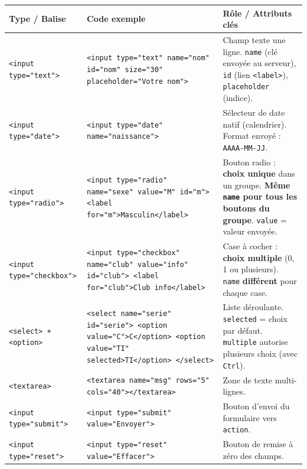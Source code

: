 \documentclass[11pt]{article}
\begin{document}
\begin{propriete}
\begin{center}
\begin{tabularx}{\linewidth}{|l|X|X|}
\hline
\textbf{Type / Balise} & \textbf{Code exemple} & \textbf{Rôle / Attributs clés} \\ \hline
\texttt{<input type="text">} & \texttt{<input type="text" name="nom" id="nom" size="30" placeholder="Votre nom">} & Champ texte une ligne. \texttt{name} (clé envoyée au serveur), \texttt{id} (lien \texttt{<label>}), \texttt{placeholder} (indice). \\ \hline
\texttt{<input type="date">} & \texttt{<input type="date" name="naissance">} & Sélecteur de date natif (calendrier). Format envoyé : \texttt{AAAA-MM-JJ}. \\ \hline
\texttt{<input type="radio">} & \texttt{<input type="radio" name="sexe" value="M" id="m"> <label for="m">Masculin</label>} & Bouton radio : \textbf{choix unique} dans un groupe. \textbf{Même \texttt{name} pour tous les boutons du groupe}. \texttt{value} = valeur envoyée. \\ \hline
\texttt{<input type="checkbox">} & \texttt{<input type="checkbox" name="club" value="info" id="club"> <label for="club">Club info</label>} & Case à cocher : \textbf{choix multiple} (0, 1 ou plusieurs). \texttt{name} \textbf{différent} pour chaque case. \\ \hline
\texttt{<select> + <option>} & \texttt{<select name="serie" id="serie"> <option value="C">C</option> <option value="TI" selected>TI</option> </select>} & Liste déroulante. \texttt{selected} = choix par défaut. \texttt{multiple} autorise plusieurs choix (avec \texttt{Ctrl}). \\ \hline
\texttt{<textarea>} & \texttt{<textarea name="msg" rows="5" cols="40"></textarea>} & Zone de texte multi-lignes. \\ \hline
\texttt{<input type="submit">} & \texttt{<input type="submit" value="Envoyer">} & Bouton d'envoi du formulaire vers \texttt{action}. \\ \hline
\texttt{<input type="reset">} & \texttt{<input type="reset" value="Effacer">} & Bouton de remise à zéro des champs. \\ \hline
\end{tabularx}
\end{center}
\end{propriete}
\end{document}
